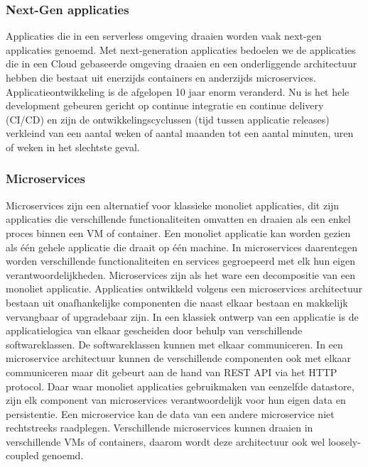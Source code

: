 \subsubsection{Next-Gen applicaties}
Applicaties die in een serverless omgeving draaien worden vaak next-gen applicaties genoemd. Met next-generation applicaties bedoelen we de applicaties die in een Cloud gebaseerde omgeving draaien en een onderliggende architectuur hebben die bestaat uit enerzijds containers en anderzijds microservices. Applicatieontwikkeling is de afgelopen 10 jaar enorm veranderd. Nu is het hele development gebeuren gericht op continue integratie en continue delivery (CI/CD) en zijn de ontwikkelingscyclussen (tijd tussen applicatie releases) verkleind van een aantal weken of aantal maanden tot een aantal minuten, uren of weken in het slechtste geval. 

\subsubsection{Microservices}
Microservices zijn een alternatief voor klassieke monoliet applicaties, dit zijn applicaties die verschillende functionaliteiten omvatten en draaien als een enkel proces binnen een VM of container. Een monoliet applicatie kan worden gezien als één gehele applicatie die draait op één machine. In microservices daarentegen worden verschillende functionaliteiten en services gegroepeerd met elk hun eigen verantwoordelijkheden. Microservices zijn als het ware  een decompositie van een monoliet applicatie. Applicaties ontwikkeld volgens een microservices architectuur bestaan uit onafhankelijke componenten die naast elkaar bestaan en makkelijk vervangbaar of upgradebaar zijn. In een klassiek ontwerp van een applicatie is de applicatielogica van elkaar gescheiden door behulp van verschillende softwareklassen. De softwareklassen kunnen met elkaar communiceren. In een microservice architectuur kunnen de verschillende componenten ook met elkaar communiceren maar dit gebeurt aan de hand van REST API via het HTTP protocol. Daar waar monoliet applicaties gebruikmaken van eenzelfde datastore, zijn elk component van microservices verantwoordelijk voor hun eigen data en persistentie. Een microservice kan de data van een andere microservice niet rechtstreeks raadplegen. Verschillende microservices kunnen draaien in verschillende VMs of containers, daarom wordt deze architectuur ook wel loosely-coupled genoemd. \autocite{Fowler2014}


